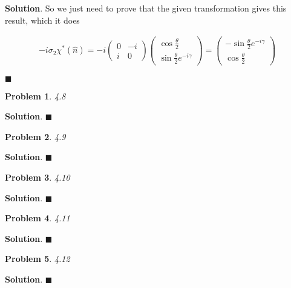 \documentclass[12pt]{article}
\newtheorem{p}{Problem}
\theoremstyle{definition}
\newenvironment{s}{%
        \begin{trivlist} \item \textbf{Solution}. }{%
            \hspace*{\fill} $\blacksquare$\end{trivlist}}%
\begin{document}
{\begin{s}
So we just need to prove that the given transformation gives this result, which it does

\begin{align*}
-i\sigma_{2}\chi^{*}(\hat{n}) = -i\begin{pmatrix}0&-i\\i&0\end{pmatrix}\begin{pmatrix}\cos\frac{\theta}{2} \\ \sin\frac{\theta}{2}e^{-i\gamma}\end{pmatrix} = \begin{pmatrix}-\sin\frac{\theta}{2}e^{-i\gamma} \\ \cos\frac{\theta}{2} \end{pmatrix}
\end{align*}


\end{s}

\begin{p}
4.8
\end{p}

\begin{s}
\end{s}

\begin{p}
4.9
\end{p}

\begin{s}
\end{s}

\begin{p}
4.10
\end{p}

\begin{s}
\end{s}


\begin{p}
4.11
\end{p}

\begin{s}
\end{s}

\begin{p}
4.12
\end{p}

\begin{s}
\end{s}
\end{document}
